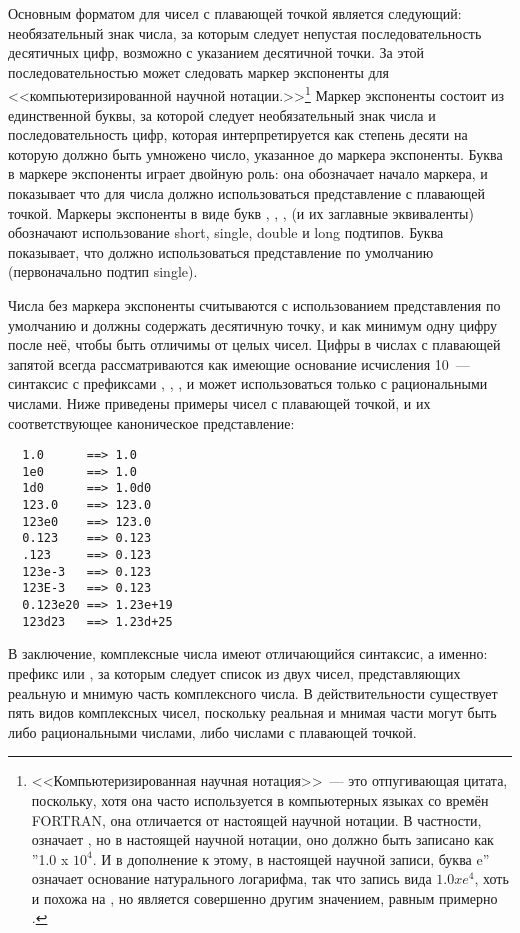 Основным форматом для чисел с плавающей точкой является следующий: необязательный знак
числа, за которым следует непустая последовательность десятичных цифр, возможно с
указанием десятичной точки.  За этой последовательностью может следовать маркер экспоненты
для <<компьютеризированной научной нотации.>>\footnote{<<Компьютеризированная научная
  нотация>>~--- это отпугивающая цитата, поскольку, хотя она часто используется в
  компьютерных языках со времён FORTRAN, она отличается от настоящей научной нотации.  В
  частности,  означает , но в настоящей научной нотации, оно
  должно быть записано как ''1.0 x $10^4$.  И в дополнение к этому, в настоящей научной
  записи, буква e'' означает основание натурального логарифма, так что запись вида $1.0 x
  e^4$, хоть и похожа на , но является совершенно другим значением, равным
  примерно .}  Маркер экспоненты состоит из единственной буквы, за которой
следует необязательный знак числа и последовательность цифр, которая интерпретируется как
степень десяти на которую должно быть умножено число, указанное до маркера экспоненты.
Буква в маркере экспоненты играет двойную роль: она обозначает начало маркера, и
показывает что для числа должно использоваться представление с плавающей точкой.  Маркеры
экспоненты в виде букв , , ,  (и их заглавные эквиваленты)
обозначают использование short, single, double и long подтипов.  Буква 
показывает, что должно использоваться представление по умолчанию (первоначально подтип
single).

Числа без маркера экспоненты считываются с использованием представления по умолчанию и
должны содержать десятичную точку, и как минимум одну цифру после неё, чтобы быть отличимы
от целых чисел.  Цифры в числах с плавающей запятой всегда рассматриваются как имеющие
основание исчисления 10~--- синтаксис с префиксами , , , и
 может использоваться только с рациональными числами.  Ниже приведены примеры
чисел с плавающей точкой, и их соответствующее каноническое представление:

\begin{verbatim}
  1.0      ==> 1.0
  1e0      ==> 1.0
  1d0      ==> 1.0d0
  123.0    ==> 123.0
  123e0    ==> 123.0
  0.123    ==> 0.123
  .123     ==> 0.123
  123e-3   ==> 0.123
  123E-3   ==> 0.123
  0.123e20 ==> 1.23e+19
  123d23   ==> 1.23d+25
\end{verbatim}

В заключение, комплексные числа имеют отличающийся синтаксис, а именно: префикс 
или , за которым следует список из двух чисел, представляющих реальную и мнимую
часть комплексного числа.  В действительности существует пять видов комплексных чисел,
поскольку реальная и мнимая части могут быть либо рациональными числами, либо числами с
плавающей точкой.

